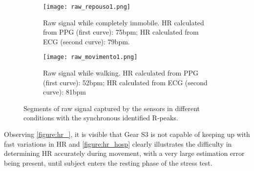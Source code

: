 \begin{figure}[!h]
	\centering
	\begin{subfigure}{0.5\textwidth}
		\texttt{[image: raw\_repouso1.png]}
		\caption{Raw signal while completely immobile. HR calculated from PPG (first curve): 75bpm; HR calculated from ECG (second curve): 79bpm.}
		\label{figure:raw_repouso}
	\end{subfigure}
	\begin{subfigure}{0.5\textwidth}
		\texttt{[image: raw\_movimento1.png]}
		\caption{Raw signal while walking. HR calculated from PPG (first curve): 52bpm; HR calculated from ECG (second curve): 81bpm}
		\label{figure:raw_movimento}
	\end{subfigure}
	\caption{Segments of raw signal captured by the sensors in different conditions with the synchronous identified R-peaks.}
	\label{figure:raw}
\end{figure}

Observing \cref{figure:hr_}, it is visible that Gear S3 is not capable of keeping up with fast variations in HR and \cref{figure:hr_hosp} clearly illustrates the difficulty in determining HR accurately during movement, with a very large estimation error being present, until subject enters the resting phase of the stress test.



